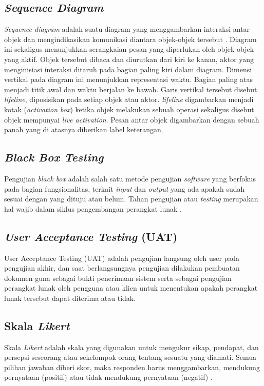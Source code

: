 \begin{flushleft}
\begin{justify}
        \subsection{\emph{Sequence Diagram}}
        \emph{Sequence diagram} adalah suatu diagram yang menggambarkan interaksi antar objek dan mengindikasikan 
        komunikasi diantara objek-objek tersebut \cite{buku scholar}. Diagram ini sekaligus menunjukkan serangkaian 
        pesan yang diperlukan oleh objek-objek yang aktif. Objek tersebut dibaca dan diurutkan dari kiri ke kanan, 
        aktor yang menginisiasi interaksi ditaruh pada bagian paling kiri dalam diagram. Dimensi vertikal pada diagram 
        ini menunjukkan representasi waktu. Bagian paling atas menjadi titik awal dan waktu berjalan ke bawah. Garis 
        vertikal tersebut disebut \emph{lifeline}, diposisikan pada setiap objek atau aktor. \emph{lifeline} 
        digambarkan menjadi kotak (\emph{activation box}) ketika objek melakukan sebuah operasi sekaligus disebut 
        objek mempunyai \emph{live activation}. Pesan antar objek digambarkan dengan sebuah panah yang di atasnya 
        diberikan label keterangan.  \\

        \subsection{\textit{Black Box Testing}}
        Pengujian \emph{black box} adalah salah satu metode pengujian \emph{software} yang berfokus pada bagian fungsionalitas, terkait \emph{input} dan \emph{output} yang ada apakah sudah sesuai dengan yang dituju atau belum. Tahan pengujian atau \emph{testing} merupakan hal wajib dalam siklus pengembangan perangkat lunak \cite{black box}.\\
       
       
        \subsection{\textit{User Acceptance Testing} (UAT)}
        User Acceptance Testing (UAT) adalah pengujian langsung oleh user pada pengujian akhir, dan saat berlangsungnya pengujian dilakukan pembuatan dokumen guna sebagai bukti penerimaan sistem \cite{uat} serta sebagai pengujian perangkat lunak oleh pengguna atau klien untuk menentukan apakah perangkat lunak tersebut dapat diterima atau tidak.
        \\

        \subsection{Skala \textit{Likert}}
        Skala \emph{Likert} adalah skala yang digunakan untuk mengukur sikap, pendapat, dan persepsi seseorang atau 
        sekelompok orang tentang sesuatu yang diamati. Semua pilihan jawaban diberi skor, maka responden harus 
        menggambarkan, mendukung pernyataan (positif) atau tidak mendukung pernyataan (negatif) \cite{likert}.






\end{justify}
\end{flushleft}
